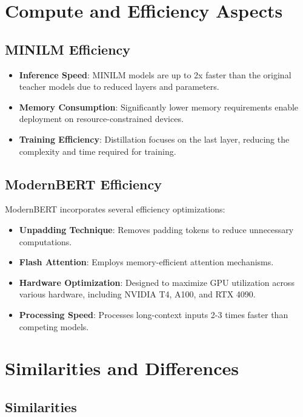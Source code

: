 \documentclass{article}
\begin{document}
\section{Compute and Efficiency Aspects}  
  
\subsection{MINILM Efficiency}  
  
\begin{itemize}  
    \item \textbf{Inference Speed}: MINILM models are up to 2x faster than the original teacher models due to reduced layers and parameters.  
    \item \textbf{Memory Consumption}: Significantly lower memory requirements enable deployment on resource-constrained devices.  
    \item \textbf{Training Efficiency}: Distillation focuses on the last layer, reducing the complexity and time required for training.  
\end{itemize}  
  
\subsection{ModernBERT Efficiency}  
  
ModernBERT incorporates several efficiency optimizations:  
  
\begin{itemize}  
    \item \textbf{Unpadding Technique}: Removes padding tokens to reduce unnecessary computations.  
    \item \textbf{Flash Attention}: Employs memory-efficient attention mechanisms.  
    \item \textbf{Hardware Optimization}: Designed to maximize GPU utilization across various hardware, including NVIDIA T4, A100, and RTX 4090.  
    \item \textbf{Processing Speed}: Processes long-context inputs 2-3 times faster than competing models.  
\end{itemize}  
  
\section{Similarities and Differences}  
  
\subsection{Similarities}  
  
\end{document}

